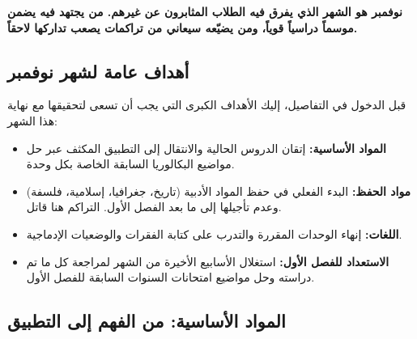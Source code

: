 \documentclass[12pt,a4paper]{book}
\newcommand{\importantAr}[1]{%
	\begin{important}
		\bfseries #1
	\end{important}
}
\begin{document}
	\importantAr{نوفمبر هو الشهر الذي يفرق فيه الطلاب المثابرون عن غيرهم. من يجتهد فيه يضمن موسماً دراسياً قوياً، ومن يضيّعه سيعاني من تراكمات يصعب تداركها لاحقاً.}
	
	\subsection*{أهداف عامة لشهر نوفمبر}
	
	قبل الدخول في التفاصيل، إليك الأهداف الكبرى التي يجب أن تسعى لتحقيقها مع نهاية هذا الشهر:
	
	\begin{itemize}
		\item \textbf{المواد الأساسية:} إتقان الدروس الحالية والانتقال إلى التطبيق المكثف عبر حل مواضيع البكالوريا السابقة الخاصة بكل وحدة.
		\item \textbf{مواد الحفظ:} البدء الفعلي في حفظ المواد الأدبية (تاريخ، جغرافيا، إسلامية، فلسفة) وعدم تأجيلها إلى ما بعد الفصل الأول. التراكم هنا قاتل.
		\item \textbf{اللغات:} إنهاء الوحدات المقررة والتدرب على كتابة الفقرات والوضعيات الإدماجية.
		\item \textbf{الاستعداد للفصل الأول:} استغلال الأسابيع الأخيرة من الشهر لمراجعة كل ما تم دراسته وحل مواضيع امتحانات السنوات السابقة للفصل الأول.
	\end{itemize}
	
	\subsection{المواد الأساسية: من الفهم إلى التطبيق}
	
\end{document}
